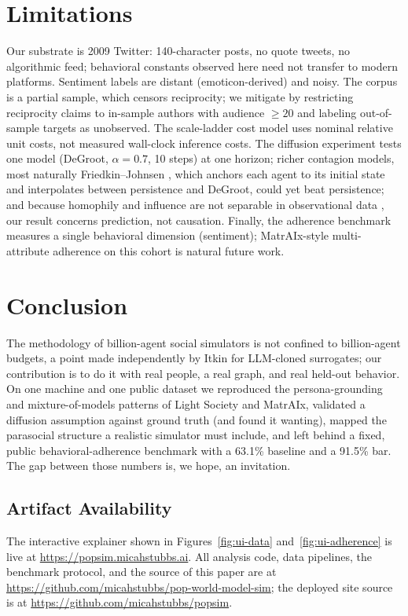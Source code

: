 \documentclass[twocolumn,10pt]{article}
\makeatletter
\newcommand{\paperurlof}[1]{\csname paperurl@#1\endcsname}
\newcommand{\ecite}[1]{\href{\paperurlof{#1}}{\NoHyper\cite{#1}\endNoHyper}}
\makeatother
\begin{document}
\section{Limitations}

Our substrate is 2009 Twitter: 140-character posts, no quote tweets, no
algorithmic feed; behavioral constants observed here need not transfer to
modern platforms. Sentiment labels are distant (emoticon-derived) and noisy.
The corpus is a partial sample, which censors reciprocity; we mitigate by
restricting reciprocity claims to in-sample authors with audience $\geq 20$
and labeling out-of-sample targets as unobserved. The scale-ladder cost model
uses nominal relative unit costs, not measured wall-clock inference costs. The
diffusion experiment tests one model (DeGroot, $\alpha=0.7$, 10 steps) at one
horizon; richer contagion models, most naturally Friedkin--Johnsen
\ecite{friedkin1990}, which anchors each agent to its initial state and
interpolates between persistence and DeGroot, could yet beat persistence; and
because homophily and influence are not separable in observational data
\ecite{shalizi2011}, our result concerns prediction, not causation. Finally, the
adherence benchmark measures a single behavioral dimension (sentiment);
MatrAIx-style multi-attribute adherence on this cohort is natural future work.

\section{Conclusion}

The methodology of billion-agent social simulators is not confined to
billion-agent budgets, a point made independently by Itkin \ecite{poorman}
for LLM-cloned surrogates; our contribution is to do it with real people, a
real graph, and real held-out behavior. On one machine and one public dataset we reproduced the
persona-grounding and mixture-of-models patterns of Light Society and MatrAIx,
validated a diffusion assumption against ground truth (and found it wanting),
mapped the parasocial structure a realistic simulator must include, and left
behind a fixed, public behavioral-adherence benchmark with a 63.1\% baseline
and a 91.5\% bar. The gap between those numbers is, we hope, an invitation.

\subsection*{Artifact Availability}
The interactive explainer shown in Figures~\ref{fig:ui-data}
and~\ref{fig:ui-adherence} is live at \url{https://popsim.micahstubbs.ai}.
All analysis code, data pipelines, the benchmark protocol, and the source of
this paper are at \url{https://github.com/micahstubbs/pop-world-model-sim};
the deployed site source is at \url{https://github.com/micahstubbs/popsim}.
\end{document}
